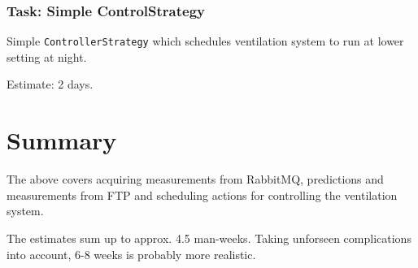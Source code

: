\subsubsection{Task: Simple ControlStrategy}
Simple \texttt{ControllerStrategy} which schedules ventilation system to run at lower setting at night.

Estimate: 2 days.


\section{Summary}
The above covers acquiring measurements from RabbitMQ, predictions and measurements from FTP and scheduling actions for controlling the ventilation system.

The estimates sum up to approx. 4.5 man-weeks. Taking unforseen complications into account, 6-8 weeks is probably more realistic. 
